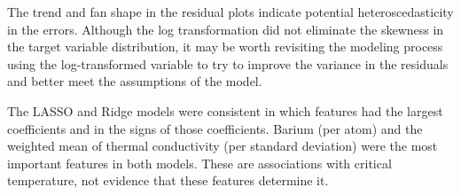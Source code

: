 \documentclass{article}
\begin{document}
The trend and fan shape in the residual plots indicate potential heteroscedasticity in the errors. Although the log transformation did not eliminate the skewness in the target variable distribution, it may be worth revisiting the modeling process using the log-transformed variable to try to improve the variance in the residuals and better meet the assumptions of the model.

The LASSO and Ridge models were consistent in which features had the largest coefficients and in the signs of those coefficients. Barium (per atom) and the weighted mean of thermal conductivity (per standard deviation) were the most important features in both models. These are associations with critical temperature, not evidence that these features determine it.
\end{document}
